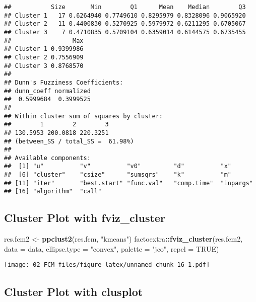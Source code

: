 \documentclass[
]{elegantbook}
\newenvironment{Shaded}{\begin{snugshade}}{\end{snugshade}}
\newcommand{\AttributeTok}[1]{\textcolor[rgb]{0.13,0.29,0.53}{#1}}
\newcommand{\ConstantTok}[1]{\textcolor[rgb]{0.56,0.35,0.01}{#1}}
\newcommand{\DecValTok}[1]{\textcolor[rgb]{0.00,0.00,0.81}{#1}}
\newcommand{\FunctionTok}[1]{\textcolor[rgb]{0.13,0.29,0.53}{\textbf{#1}}}
\newcommand{\NormalTok}[1]{#1}
\newcommand{\OtherTok}[1]{\textcolor[rgb]{0.56,0.35,0.01}{#1}}
\newcommand{\SpecialCharTok}[1]{\textcolor[rgb]{0.81,0.36,0.00}{\textbf{#1}}}
\newcommand{\StringTok}[1]{\textcolor[rgb]{0.31,0.60,0.02}{#1}}
\begin{document}
\begin{verbatim}
##           Size       Min        Q1      Mean    Median        Q3
## Cluster 1   17 0.6264940 0.7749610 0.8295979 0.8328096 0.9065920
## Cluster 2   11 0.4400830 0.5270925 0.5979972 0.6211295 0.6705067
## Cluster 3    7 0.4710835 0.5709104 0.6359014 0.6144575 0.6735455
##                 Max
## Cluster 1 0.9399986
## Cluster 2 0.7556909
## Cluster 3 0.8768570
## 
## Dunn's Fuzziness Coefficients:
## dunn_coeff normalized 
##  0.5999684  0.3999525 
## 
## Within cluster sum of squares by cluster:
##        1        2        3 
## 130.5953 200.0818 220.3251 
## (between_SS / total_SS =  61.98%) 
## 
## Available components: 
##  [1] "u"          "v"          "v0"         "d"          "x"         
##  [6] "cluster"    "csize"      "sumsqrs"    "k"          "m"         
## [11] "iter"       "best.start" "func.val"   "comp.time"  "inpargs"   
## [16] "algorithm"  "call"
\end{verbatim}

\hypertarget{cluster-plot-with-fviz_cluster}{%
\subsection{Cluster Plot with fviz\_cluster}\label{cluster-plot-with-fviz_cluster}}

\begin{Shaded}
\begin{Highlighting}[]
\NormalTok{res.fcm2 }\OtherTok{\textless{}{-}} \FunctionTok{ppclust2}\NormalTok{(res.fcm, }\StringTok{"kmeans"}\NormalTok{)}
\NormalTok{factoextra}\SpecialCharTok{::}\FunctionTok{fviz\_cluster}\NormalTok{(res.fcm2, }\AttributeTok{data =}\NormalTok{ data, }
  \AttributeTok{ellipse.type =} \StringTok{"convex"}\NormalTok{,}
  \AttributeTok{palette =} \StringTok{"jco"}\NormalTok{,}
  \AttributeTok{repel =} \ConstantTok{TRUE}\NormalTok{)}
\end{Highlighting}
\end{Shaded}

\texttt{[image: 02-FCM\_files/figure-latex/unnamed-chunk-16-1.pdf]}

\hypertarget{cluster-plot-with-clusplot}{%
\subsection{Cluster Plot with clusplot}\label{cluster-plot-with-clusplot}}

\begin{Shaded}
\end{Shaded}
\end{document}
